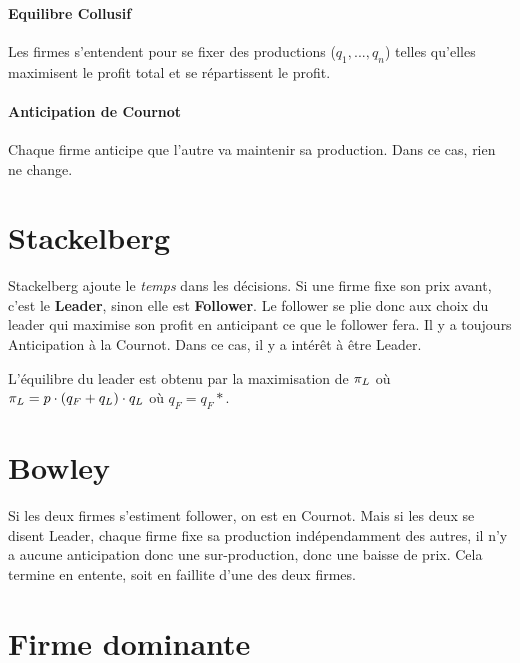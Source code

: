 \paragraph{Equilibre Collusif}
Les firmes s'entendent pour se fixer des productions ($q_1,...,q_n$) telles
qu'elles maximisent le profit total et se répartissent le profit.

\paragraph{Anticipation de Cournot}
Chaque firme anticipe que l'autre va maintenir sa production.
Dans ce cas, rien ne change.


\section{Stackelberg}
Stackelberg ajoute le \emph{temps} dans les décisions. Si une firme fixe son
prix avant, c'est le \textbf{Leader}, sinon elle est \textbf{Follower}.
Le follower se plie donc aux choix du leader qui maximise son profit en
anticipant ce que le follower fera. Il y a toujours Anticipation à la Cournot.
Dans ce cas, il y a intérêt à être Leader.

L'équilibre du leader est obtenu par la maximisation de $\pi_L$ où 
$\pi_L = p\cdot (q_F+q_L)\cdot q_L$ où $q_F = q_F*$. 

\section{Bowley}
Si les deux firmes s'estiment follower, on est en Cournot. Mais si les deux se
disent Leader, chaque firme fixe sa production indépendamment des autres,
il n'y a aucune anticipation donc une sur-production, donc une baisse de prix.
Cela termine en entente, soit en faillite d'une des deux firmes.

\section{Firme dominante}


